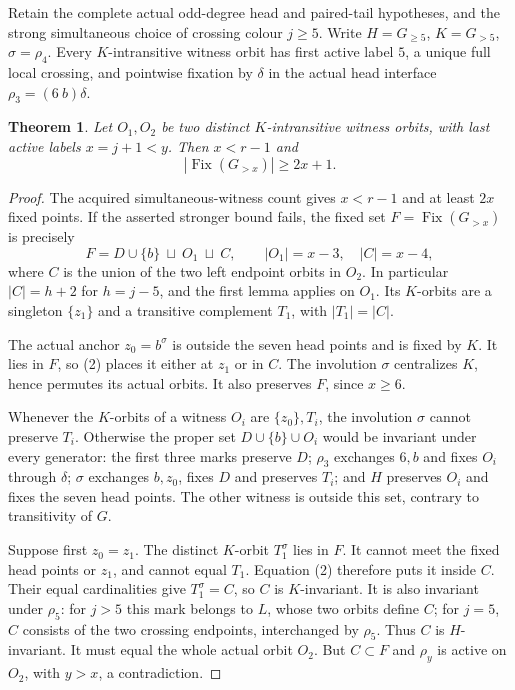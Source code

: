 \documentclass[11pt,a4paper]{article}
\newtheorem{theorem}[lemma]{Theorem}
\begin{document}
Retain the complete actual odd-degree head and
paired-tail hypotheses, and the strong simultaneous
choice of crossing colour $j\ge5$. Write
$H=G_{\ge5}$, $K=G_{>5}$, $\sigma=\rho_4$.
Every $K$-intransitive witness orbit has first
active label $5$, a unique full local crossing,
and pointwise fixation by $\delta$ in the actual
head interface $\rho_3=(6\ b)\delta$.

\begin{theorem}
Let $O_1,O_2$ be two distinct $K$-intransitive
witness orbits, with last active labels $x=j+1<y$.
Then $x<r-1$ and
\[
                   |\operatorname{Fix}(G_{>x})|\ge2x+1.
\]
\end{theorem}
\begin{proof}
The acquired simultaneous-witness count gives
$x<r-1$ and at least $2x$ fixed points. If the
asserted stronger bound fails, the fixed set
$F=\operatorname{Fix}(G_{>x})$ is precisely
\[
 F=D\cup\{b\}\ \sqcup\ O_1\ \sqcup\ C,
 \qquad |O_1|=x-3,\quad |C|=x-4,                 \tag{2}
\]
where $C$ is the union of the two left endpoint
orbits in $O_2$. In particular $|C|=h+2$ for
$h=j-5$, and the first lemma applies on $O_1$.
Its $K$-orbits are a singleton $\{z_1\}$ and
a transitive complement $T_1$, with $|T_1|=|C|$.

The actual anchor $z_0=b^\sigma$ is outside
the seven head points and is fixed by $K$.
It lies in $F$, so (2) places it either at
$z_1$ or in $C$. The involution $\sigma$
centralizes $K$, hence permutes its actual
orbits. It also preserves $F$, since $x\ge6$.

Whenever the $K$-orbits of a witness $O_i$
are $\{z_0\},T_i$, the involution $\sigma$
cannot preserve $T_i$. Otherwise the proper
set $D\cup\{b\}\cup O_i$ would be invariant
under every generator: the first three marks
preserve $D$; $\rho_3$ exchanges $6,b$ and
fixes $O_i$ through $\delta$; $\sigma$
exchanges $b,z_0$, fixes $D$ and preserves
$T_i$; and $H$ preserves $O_i$ and fixes the
seven head points. The other witness is outside
this set, contrary to transitivity of $G$.

Suppose first $z_0=z_1$. The distinct $K$-orbit
$T_1^\sigma$ lies in $F$. It cannot meet the
fixed head points or $z_1$, and cannot equal
$T_1$. Equation (2) therefore puts it inside
$C$. Their equal cardinalities give
$T_1^\sigma=C$, so $C$ is $K$-invariant.
It is also invariant under $\rho_5$: for
$j>5$ this mark belongs to $L$, whose two
orbits define $C$; for $j=5$, $C$ consists
of the two crossing endpoints, interchanged
by $\rho_5$. Thus $C$ is $H$-invariant.
It must equal the whole actual orbit $O_2$.
But $C\subset F$ and $\rho_y$ is active on
$O_2$, with $y>x$, a contradiction.


\end{proof}
\end{document}
